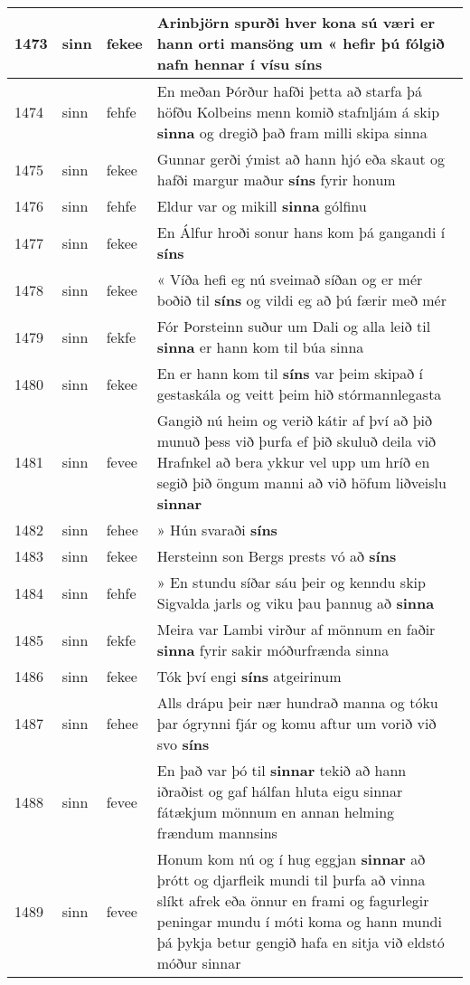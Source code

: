 \documentclass{article}
\begin{document}
\begin{longtable}{p{1cm}|p{1cm}|p{1cm}|p{13cm}}
\hline
1473&sinn&fekee&Arinbjörn spurði hver kona sú væri er hann orti mansöng um « hefir þú fólgið nafn hennar í vísu \textbf{síns} \\
\hline
1474&sinn&fehfe&En meðan Þórður hafði þetta að starfa þá höfðu Kolbeins menn komið stafnljám á skip \textbf{sinna} og dregið það fram milli skipa sinna\\
\hline
1475&sinn&fekee&Gunnar gerði ýmist að hann hjó eða skaut og hafði margur maður \textbf{síns} fyrir honum\\
\hline
1476&sinn&fehfe&Eldur var og mikill \textbf{sinna} gólfinu\\
\hline
1477&sinn&fekee&En Álfur hroði sonur hans kom þá gangandi í \textbf{síns} \\
\hline
1478&sinn&fekee&« Víða hefi eg nú sveimað síðan og er mér boðið til \textbf{síns} og vildi eg að þú færir með mér\\
\hline
1479&sinn&fekfe&Fór Þorsteinn suður um Dali og alla leið til \textbf{sinna} er hann kom til búa sinna\\
\hline
1480&sinn&fekee&En er hann kom til \textbf{síns} var þeim skipað í gestaskála og veitt þeim hið stórmannlegasta\\
\hline
1481&sinn&fevee&Gangið nú heim og verið kátir af því að þið munuð þess við þurfa ef þið skuluð deila við Hrafnkel að bera ykkur vel upp um hríð en segið þið öngum manni að við höfum liðveislu \textbf{sinnar} \\
\hline
1482&sinn&fehee&» Hún svaraði \textbf{síns} \\
\hline
1483&sinn&fekee&Hersteinn son Bergs prests vó að \textbf{síns} \\
\hline
1484&sinn&fehfe&» En stundu síðar sáu þeir og kenndu skip Sigvalda jarls og viku þau þannug að \textbf{sinna} \\
\hline
1485&sinn&fekfe&Meira var Lambi virður af mönnum en faðir \textbf{sinna} fyrir sakir móðurfrænda sinna\\
\hline
1486&sinn&fekee&Tók því engi \textbf{síns} atgeirinum\\
\hline
1487&sinn&fehee&Alls drápu þeir nær hundrað manna og tóku þar ógrynni fjár og komu aftur um vorið við svo \textbf{síns} \\
\hline
1488&sinn&fevee&En það var þó til \textbf{sinnar} tekið að hann iðraðist og gaf hálfan hluta eigu sinnar fátækjum mönnum en annan helming frændum mannsins\\
\hline
1489&sinn&fevee&Honum kom nú og í hug eggjan \textbf{sinnar} að þrótt og djarfleik mundi til þurfa að vinna slíkt afrek eða önnur en frami og fagurlegir peningar mundu í móti koma og hann mundi þá þykja betur gengið hafa en sitja við eldstó móður sinnar\\

\end{longtable}
\end{document}
